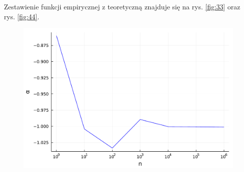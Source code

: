 \documentclass{article}
\theoremstyle{break}
\numberwithin{equation}{subsection}
\numberwithin{figure}{section}
\begin{document}
Zestawienie funkcji empirycznej z teoretyczną znajduje się na rys. \ref{fig:33} oraz rys. \ref{fig:44}.
\begin{figure}
	\begin{center}
		\includegraphics[scale=0.30]{alpha.pdf}
		\caption{}
		\label{fig:a}
	\end{center}
\end{figure}
\end{document}
